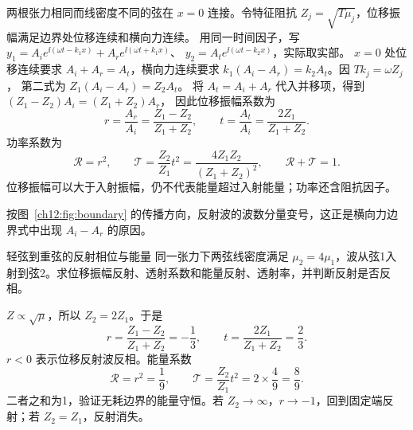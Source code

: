 两根张力相同而线密度不同的弦在 $x=0$ 连接。令特征阻抗 $Z_j=\sqrt{T\mu_j}$，位移振幅满足边界处位移连续和横向力连续。
用同一时间因子，写
$y_1=A_i e^{\ii(\omega t-k_1x)}+A_r e^{\ii(\omega t+k_1x)}$、
$y_2=A_t e^{\ii(\omega t-k_2x)}$，实际取实部。
$x=0$ 处位移连续要求 $A_i+A_r=A_t$，横向力连续要求
$k_1(A_i-A_r)=k_2A_t$。因 $Tk_j=\omega Z_j$，
第二式为 $Z_1(A_i-A_r)=Z_2A_t$。
将 $A_t=A_i+A_r$ 代入并移项，得到 $(Z_1-Z_2)A_i=(Z_1+Z_2)A_r$，
因此位移振幅系数为
\begin{equation}
 r=\frac{A_r}{A_i}=\frac{Z_1-Z_2}{Z_1+Z_2},
 \qquad
 t=\frac{A_t}{A_i}=\frac{2Z_1}{Z_1+Z_2}.
\end{equation}
功率系数为
\begin{equation}
 \mathcal R=r^2,
 \qquad
 \mathcal T=\frac{Z_2}{Z_1}t^2
 =\frac{4Z_1Z_2}{(Z_1+Z_2)^2},
 \qquad \mathcal R+\mathcal T=1.
\end{equation}
位移振幅可以大于入射振幅，仍不代表能量超过入射能量；功率还含阻抗因子。

\begin{center}\begin{minipage}{\linewidth}\centering
{}
\label{ch12:fig:boundary}
\end{minipage}\end{center}
按图~\ref{ch12:fig:boundary} 的传播方向，反射波的波数分量变号，这正是横向力边界式中出现 $A_i-A_r$ 的原因。

\begin{origexamplebox}{轻弦到重弦的反射相位与能量}
\label{ch12:ex:08}
同一张力下两弦线密度满足 $\mu_2=4\mu_1$，波从弦1入射到弦2。求位移振幅反射、透射系数和能量反射、透射率，并判断反射是否反相。

\ThQStringInterface
\end{origexamplebox}
\begin{xesolution}
\ThAStringInterface

$Z\propto\sqrt\mu$，所以 $Z_2=2Z_1$。于是
\[
 r=\frac{Z_1-Z_2}{Z_1+Z_2}=-\frac13,
 \qquad
 t=\frac{2Z_1}{Z_1+Z_2}=\frac23.
\]
$r<0$ 表示位移反射波反相。能量系数
\[
 \boxed{\mathcal R=r^2=\frac19},
 \qquad
 \boxed{\mathcal T=\frac{Z_2}{Z_1}t^2
 =2\times\frac49=\frac89}.
\]
二者之和为1，验证无耗边界的能量守恒。若 $Z_2\to\infty$，$r\to-1$，回到固定端反射；若 $Z_2=Z_1$，反射消失。
\end{xesolution}

